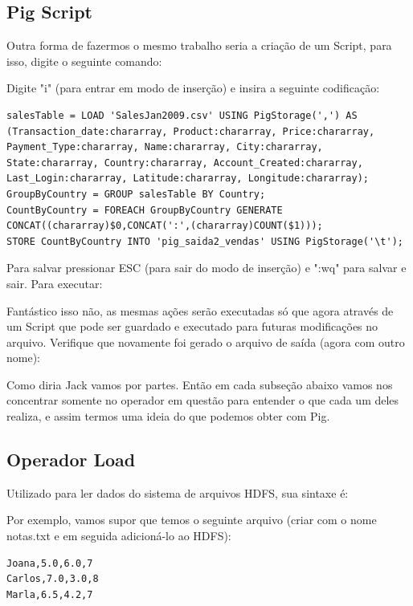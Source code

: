 \documentclass[a4paper,11pt]{article}
\begin{document}
\subsection{Pig Script}
Outra forma de fazermos o mesmo trabalho seria a criação de um Script, para isso, digite o seguinte comando: \\

Digite "i" (para entrar em modo de inserção) e insira a seguinte codificação:
\begin{lstlisting}[]
salesTable = LOAD 'SalesJan2009.csv' USING PigStorage(',') AS (Transaction_date:chararray, Product:chararray, Price:chararray, Payment_Type:chararray, Name:chararray, City:chararray, State:chararray, Country:chararray, Account_Created:chararray, Last_Login:chararray, Latitude:chararray, Longitude:chararray);
GroupByCountry = GROUP salesTable BY Country;
CountByCountry = FOREACH GroupByCountry GENERATE CONCAT((chararray)$0,CONCAT(':',(chararray)COUNT($1)));
STORE CountByCountry INTO 'pig_saida2_vendas' USING PigStorage('\t');
\end{lstlisting}

Para salvar pressionar ESC (para sair do modo de inserção) e ":wq" para salvar e sair. Para executar: \\

Fantástico isso não, as mesmas ações serão executadas só que agora através de um Script que pode ser guardado e executado para futuras modificações no arquivo. Verifique que novamente foi gerado o arquivo de saída (agora com outro nome): \\

Como diria Jack vamos por partes. Então em cada subseção abaixo vamos nos concentrar somente no operador em questão para entender o que cada um deles realiza, e assim termos uma ideia do que podemos obter com Pig.

\subsection{Operador Load}
Utilizado para ler dados do sistema de arquivos HDFS, sua sintaxe é: \\

Por exemplo, vamos supor que temos o seguinte arquivo (criar com o nome notas.txt e em seguida adicioná-lo ao HDFS):
\begin{lstlisting}[]
Joana,5.0,6.0,7
Carlos,7.0,3.0,8
Marla,6.5,4.2,7
\end{lstlisting}
\end{document}
